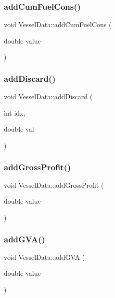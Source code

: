 \subsubsection{\texorpdfstring{addCumFuelCons()}{addCumFuelCons()}}
{\footnotesize\ttfamily void Vessel\+Data\+::add\+Cum\+Fuel\+Cons (\begin{DoxyParamCaption}\item[{double}]{value }\end{DoxyParamCaption})}

\mbox{\label{class_vessel_data_aa0509d3bf8bf1b10ece1baa52086cd23}} 
\subsubsection{\texorpdfstring{addDiscard()}{addDiscard()}}
{\footnotesize\ttfamily void Vessel\+Data\+::add\+Discard (\begin{DoxyParamCaption}\item[{int}]{idx,  }\item[{double}]{val }\end{DoxyParamCaption})}

\mbox{\label{class_vessel_data_ada6a6f4380bd2a22eafbc6e57b0971e6}} 
\subsubsection{\texorpdfstring{addGrossProfit()}{addGrossProfit()}}
{\footnotesize\ttfamily void Vessel\+Data\+::add\+Gross\+Profit (\begin{DoxyParamCaption}\item[{double}]{value }\end{DoxyParamCaption})}

\mbox{\label{class_vessel_data_a9d48860436ceb0817cb42cf6e3a785e7}} 
\subsubsection{\texorpdfstring{addGVA()}{addGVA()}}
{\footnotesize\ttfamily void Vessel\+Data\+::add\+G\+VA (\begin{DoxyParamCaption}\item[{double}]{value }\end{DoxyParamCaption})}

